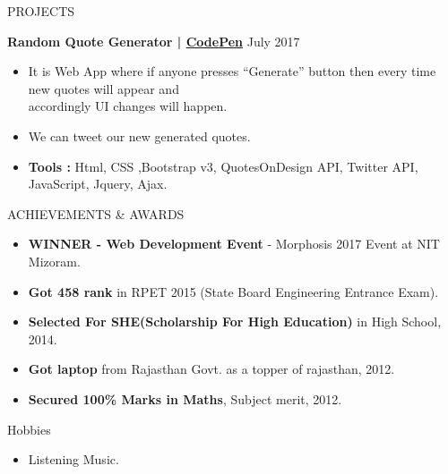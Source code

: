\documentclass{resume} %
\begin{document}
\begin{rSection}{PROJECTS}

{\textbf{Random Quote Generator | \href{https://codepen.io/geekabhi007/pen/RgqBZX}{CodePen} }} \hfill July 2017{}{} 
\begin{itemize}
\item It is Web App where if anyone presses “Generate” button then every time new quotes will appear and \\accordingly UI changes will happen.
\item We can tweet our new generated quotes. 
\item \textbf{Tools :}  Html, CSS ,Bootstrap v3, QuotesOnDesign API, Twitter API, JavaScript, Jquery, Ajax. 
\end{itemize}

 



\end{rSection}  %



\begin{rSection}{ACHIEVEMENTS \&  AWARDS} \itemsep -2pt   

\begin{itemize}
 \item \textbf{WINNER - Web Development Event} - Morphosis 2017 Event at NIT Mizoram.
 \item \textbf{Got 458 rank } in RPET 2015 (State Board Engineering Entrance Exam).
 \item \textbf{Selected For SHE(Scholarship For High Education)} in High School, 2014.
 \item \textbf{Got laptop} from Rajasthan Govt. as a topper of rajasthan, 2012.
 \item \textbf{Secured 100\% Marks in Maths}, Subject merit, 2012.

\end{itemize}  


\end{rSection} 

\begin{rSection}{ Hobbies  } \itemsep -3pt        
\begin{itemize}
\item Listening Music.
\end{itemize}
\end{rSection}

\end{document}
